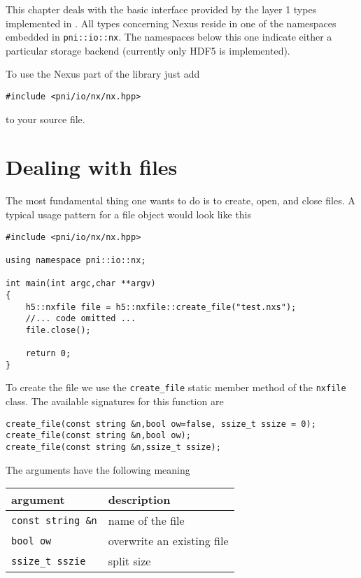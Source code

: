 
This chapter deals with the basic interface provided by the layer 1 types
implemented in \libpniio. All types concerning Nexus reside in one of the
namespaces embedded in {\tt pni::io::nx}. The namespaces below this one 
indicate either a particular storage backend (currently only HDF5 is
implemented).

To use the Nexus part of the library just add 
\begin{verbatim}
#include <pni/io/nx/nx.hpp>
\end{verbatim}
to your source file. 

\section{Dealing with files}
The most fundamental thing one wants to do is to create, open, and close files. 
A typical usage pattern for a file object would look like this
\begin{verbatim}
#include <pni/io/nx/nx.hpp>

using namespace pni::io::nx;

int main(int argc,char **argv)
{
    h5::nxfile file = h5::nxfile::create_file("test.nxs");
    //... code omitted ...
    file.close();

    return 0;
}
\end{verbatim}
To create the file we use the {\tt create\_file} static member method of the
{\tt nxfile} class. The available signatures for this function are
\begin{verbatim}
create_file(const string &n,bool ow=false, ssize_t ssize = 0);
create_file(const string &n,bool ow);
create_file(const string &n,ssize_t ssize);
\end{verbatim}
The arguments have the following meaning
\begin{center}
\begin{tabular}{l|l}
argument & description \\
\hline\hline
{\tt const string \&n} & name of the file \\
\hline
{\tt bool ow} & overwrite an existing file \\
\hline
{\tt ssize\_t sszie} & split size \\
\hline
\end{tabular}
\end{center}
